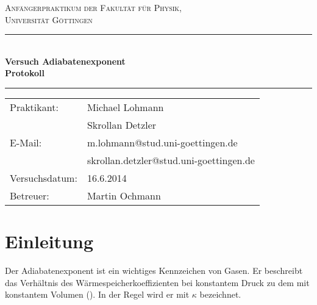 \documentclass[12pt,a4paper,titlepage,headinclude,bibtotoc]{scrartcl}
\begin{document}
\begin{titlepage}
\centering
\textsc{\Large Anfängerpraktikum der Fakultät für
  Physik,\\[1.5ex] Universität Göttingen}

\vspace*{4.2cm}

\rule{\textwidth}{1pt}\\[0.5cm]
{\huge \bfseries
  Versuch Adiabatenexponent\\[1.5ex]
  Protokoll}\\[0.5cm]
\rule{\textwidth}{1pt}

\vspace*{3cm}

\begin{Large}
\begin{tabular}{ll}
Praktikant: 	& Michael Lohmann\\
		& Skrollan Detzler\\
E-Mail: 	& m.lohmann@stud.uni-goettingen.de\\
 		& skrollan.detzler@stud.uni-goettingen.de\\
Versuchsdatum:	& 16.6.2014\\
Betreuer: 	& Martin Ochmann\\
\end{tabular}
\end{Large}

\vspace*{0.8cm}

\begin{Large}
\end{Large}

\end{titlepage}

\tableofcontents

\newpage

\section{Einleitung}
\label{sec:einleitung}
Der Adiabatenexponent ist ein wichtiges Kennzeichen von Gasen.
Er beschreibt das Verhältnis des Wärmespeicherkoeffizienten bei konstantem Druck zu dem mit konstantem Volumen (\cite[S. 263]{gerthsen}).
In der Regel wird er mit $\kappa$ bezeichnet.
\end{document}
